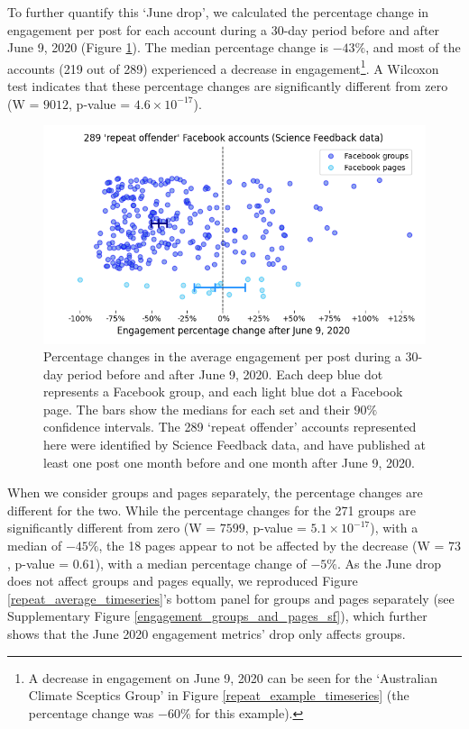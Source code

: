 \documentclass[review]{elsarticle}
\begin{document}
To further quantify this ‘June drop’, we calculated the percentage change in engagement per post for each account during a 30-day period before and after June 9, 2020 (Figure \ref{repeat_june_drop_percentage_change}). 
The median percentage change is $-43\%$, and most of the accounts (219 out of 289) experienced a decrease in engagement\footnote{A decrease in engagement on June 9, 2020 can be seen for the `Australian Climate Sceptics Group' in Figure \ref{repeat_example_timeseries} (the percentage change was $-60\%$ for this example).}.
A Wilcoxon test indicates that these percentage changes are significantly different from zero (W = $9012$, p-value = $4.6 \times 10^{-17}$).

\begin{figure}[!h]
\centering
\includegraphics[scale=0.5]{./../figure/sf_june_drop_percentage_change.png}
\caption{
Percentage changes in the average engagement per post during a 30-day period before and after June 9, 2020. 
Each deep blue dot represents a Facebook group, and each light blue dot a Facebook page.
The bars show the medians for each set and their $90\%$ confidence intervals.
The 289 `repeat offender' accounts represented here were identified by Science Feedback data, and have published at least one post one month before and one month after June 9, 2020.
}
\label{repeat_june_drop_percentage_change}
\end{figure}

When we consider groups and pages separately, the percentage changes are different for the two.
While the percentage changes for the 271 groups are significantly different from zero (W = $7599$, p-value = $5.1 \times 10^{-17}$), with a median of $-45\%$,
the 18 pages appear to not be affected by the decrease (W = $73$, p-value = $0.61$), with a median percentage change of $-5\%$. 
As the June drop does not affect groups and pages equally, we reproduced Figure \ref{repeat_average_timeseries}’s bottom panel for groups and pages separately (see Supplementary Figure \ref{engagement_groups_and_pages_sf}), which further shows that the June 2020 engagement metrics’ drop only affects groups.
\end{document}
